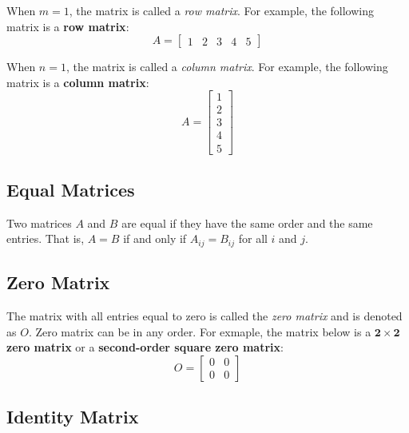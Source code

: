 \documentclass{report}
\begin{document}
\begin{multicols}{2}
    When $m = 1$, the matrix is called a \emph{row matrix}. For example, the
    following matrix is a \textbf{row matrix}:
    \[
        A = \begin{bmatrix}
            1 & 2 & 3 & 4 & 5
        \end{bmatrix}
    \]

    When $n = 1$, the matrix is called a \emph{column matrix}. For example, the
    following matrix is a \textbf{column matrix}:
    \[
        A = \begin{bmatrix}
            1 \\
            2 \\
            3 \\
            4 \\
            5
        \end{bmatrix}
    \]

    \singlespacing{}

    \subsection*{Equal Matrices}

    \doublespacing{}

    Two matrices $A$ and $B$ are equal if they have the same order and the same
    entries. That is, $A = B$ if and only if $A_{ij} = B_{ij}$ for all $i$ and $j$.

    \singlespacing{}

    \subsection*{Zero Matrix}

    \doublespacing{}

    The matrix with all entries equal to zero is called the \emph{zero matrix} and
    is denoted as $O$. Zero matrix can be in any order. For exmaple, the matrix
    below is a \textbf{$\mathbf{2 \times 2}$ zero matrix} or a \textbf{second-order
        square zero matrix}:
    \[
        O = \begin{bmatrix}
            0 & 0 \\
            0 & 0
        \end{bmatrix}
    \]

    \singlespacing{}

    \subsection*{Identity Matrix}


\end{multicols}
\end{document}
